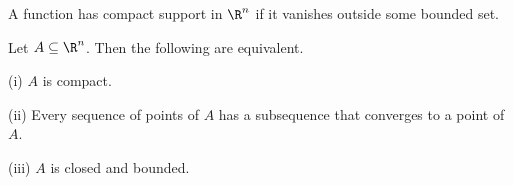 \begin{definition}
A function has compact support in $\R^n$ if it vanishes outside some bounded set.
\end{definition}




\begin{theorem}\label{thm:heine_borel_compact_real_n_closed_bounded}
Let $A \subseteq \R^n$. Then the following are equivalent.
\ben
\item [(i)] $A$ is compact.
\item [(ii)] Every sequence of points of $A$ has a subsequence that converges to a point of $A$.
\item [(iii)] $A$ is closed and bounded.
\een
\end{theorem}



